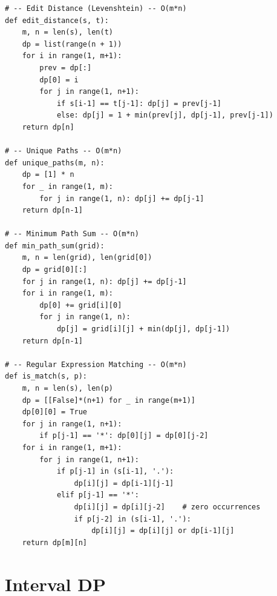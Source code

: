 \documentclass[11pt,a4paper]{report}
\begin{document}
\begin{lstlisting}
# -- Edit Distance (Levenshtein) -- O(m*n)
def edit_distance(s, t):
    m, n = len(s), len(t)
    dp = list(range(n + 1))
    for i in range(1, m+1):
        prev = dp[:]
        dp[0] = i
        for j in range(1, n+1):
            if s[i-1] == t[j-1]: dp[j] = prev[j-1]
            else: dp[j] = 1 + min(prev[j], dp[j-1], prev[j-1])
    return dp[n]

# -- Unique Paths -- O(m*n)
def unique_paths(m, n):
    dp = [1] * n
    for _ in range(1, m):
        for j in range(1, n): dp[j] += dp[j-1]
    return dp[n-1]

# -- Minimum Path Sum -- O(m*n)
def min_path_sum(grid):
    m, n = len(grid), len(grid[0])
    dp = grid[0][:]
    for j in range(1, n): dp[j] += dp[j-1]
    for i in range(1, m):
        dp[0] += grid[i][0]
        for j in range(1, n):
            dp[j] = grid[i][j] + min(dp[j], dp[j-1])
    return dp[n-1]

# -- Regular Expression Matching -- O(m*n)
def is_match(s, p):
    m, n = len(s), len(p)
    dp = [[False]*(n+1) for _ in range(m+1)]
    dp[0][0] = True
    for j in range(1, n+1):
        if p[j-1] == '*': dp[0][j] = dp[0][j-2]
    for i in range(1, m+1):
        for j in range(1, n+1):
            if p[j-1] in (s[i-1], '.'):
                dp[i][j] = dp[i-1][j-1]
            elif p[j-1] == '*':
                dp[i][j] = dp[i][j-2]    # zero occurrences
                if p[j-2] in (s[i-1], '.'):
                    dp[i][j] = dp[i][j] or dp[i-1][j]
    return dp[m][n]
\end{lstlisting}

\section{Interval DP}
\end{document}
